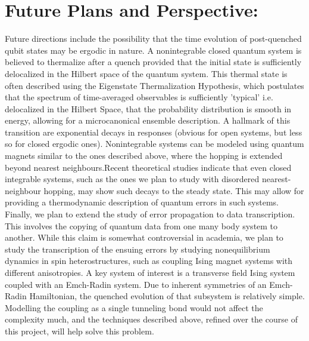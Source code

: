 \documentclass[a4paper,9pt]{article}
\begin{document}
\section{Future Plans and Perspective:}

Future directions include the possibility that the time evolution of post-quenched qubit states may be ergodic in nature. A nonintegrable closed quantum system is believed to thermalize after a quench provided that the initial state is sufficiently delocalized in the Hilbert space of the quantum system. This thermal state is often described using the Eigenstate Thermalization Hypothesis, which postulates that the spectrum of time-averaged observables is sufficiently 'typical' i.e. delocalized in the Hilbert Space, that the probability distribution is smooth in energy, allowing for a microcanonical ensemble description. A hallmark of this transition are exponential decays in responses (obvious for open systems, but less so for closed ergodic ones). Nonintegrable systems can be modeled using quantum magnets similar to the ones described above, where the hopping is extended beyond nearest neighbours.Recent theoretical studies indicate that even closed integrable systems, such as the ones we plan to study with 
disordered nearest-neighbour hopping, may show such decays to the steady state. This may allow for providing a thermodynamic description of quantum errors in such systems. Finally, we plan to extend the study of error propagation to data transcription. This involves the copying of quantum data from one many body system to another. While this claim is somewhat controversial in academia, we plan to study the transcription of the ensuing errors by studying nonequilibrium dynamics in spin heterostructures, such as coupling Ising magnet systems with different  anisotropies.  A key system of interest is a transverse field Ising system coupled with an Emch-Radin system. Due to inherent symmetries of an Emch-Radin Hamiltonian, the quenched evolution of that subsystem is relatively simple. Modelling the coupling as a single tunneling bond would not affect the complexity much, and the techniques described above, refined over the course of this project, will help solve this problem.
\end{document}
